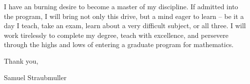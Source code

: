 \documentclass{article}
\begin{document}
\par{I have an burning desire to become a master of my discipline. If admitted into the program, I will bring not only this drive, but a mind eager to learn -- be it a day I teach, take an exam, learn about a very difficult subject, or all three. I will work tirelessly to complete my degree, teach with excellence, and persevere through the highs and lows of entering a graduate program for mathematics.}

\vspace{5mm}

Thank you, 
\vspace{5mm}

Samuel Straubmuller 
 
\end{document}
